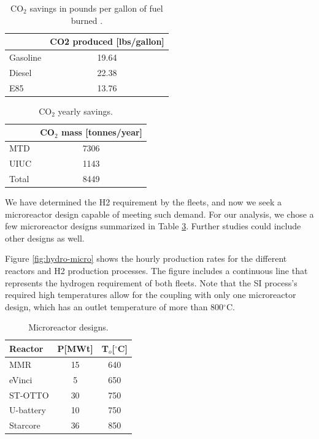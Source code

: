 	\begin{table}[htbp!]
		\centering
	    \caption{CO$_2$ savings in pounds per gallon of fuel burned \cite{energy_information_administration_how_2014}.}
		\begin{tabular}{l|c}
		\hline
		              & \gls{CO2} produced [lbs/gallon] \\ \hline
		Gasoline      & 19.64           \\
		Diesel        & 22.38           \\
		E85           & 13.76           \\ \hline
        \end{tabular}
        \label{tab:co2-eq}
	\end{table}

	\begin{table}[htbp!]
		\centering
	    \caption{CO$_2$ yearly savings.}
		\begin{tabular}{l|c}
		\hline
		            & CO$_2$ mass [tonnes/year] \\ \hline
		MTD      	& 7306           \\
		UIUC        & 1143           \\
		Total       & 8449           \\ \hline
        \end{tabular}
        \label{tab:co2}
	\end{table}

We have determined the \gls{H2} requirement by the fleets, and now we seek a microreactor design capable of meeting such demand.
For our analysis, we chose a few microreactor designs summarized in Table \ref{tab:hydro-micro}.
Further studies could include other designs as well.

Figure \ref{fig:hydro-micro} shows the hourly production rates for the different reactors and \gls{H2} production processes.
The figure includes a continuous line that represents the hydrogen requirement of both fleets.
Note that the \gls{SI} process's required high temperatures allow for the coupling with only one microreactor design, which has an outlet temperature of more than 800$^{\circ}$C.

	\begin{table}[htbp!]
		\centering
	    \caption{Microreactor designs.}
		\begin{tabular}{l|cc}
		\hline
		Reactor                                      & P[MWt] & T$_o$[$^\circ$C] \\ \hline
		MMR \cite{usnc_mmr_2019}  		             & 15           & 640              \\
		eVinci \cite{hernandez_micro_2019}           & 5            & 650              \\
		ST-OTTO \cite{harlan_x-energy_2018}          & 30           & 750              \\
		U-battery \cite{ding_design_2011}            & 10           & 750              \\
		Starcore \cite{star_core_nuclear_star_2015}  & 36           & 850              \\ \hline
        \end{tabular}
        \label{tab:hydro-micro}
	\end{table}

